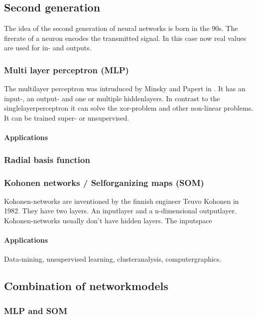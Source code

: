 \documentclass[10pt,a4paper,DIV=11]{scrreprt}
\begin{document}
\subsection{Second generation}
The idea of the second generation of neural networks is born in the 90s. The firerate of a neuron encodes the transmitted signal. In this case now real values are used for in- and outputs.

\subsubsection{Multi layer perceptron (MLP)} \label{sec:mlp}
The multilayer perceptron was intruduced by Minsky and Papert in . It has an input-, an output- and
one or multiple hiddenlayers. In contrast to the singlelayerperceptron it can solve the xor-problem and other non-linear problems. It can be trained super- or unsupervised.

\paragraph{Applications}

\subsubsection{Radial basis function} %


\subsubsection{Kohonen networks / Selforganizing maps (SOM)}
Kohonen-networks are inventioned by the finnish engineer Teuvo Kohonen in 1982. They have two layers. An inputlayer and a n-dimensional outputlayer.
Kohonen-networks usually don't have hidden layers.
The inputspace 

\paragraph{Applications}
Data-mining, unsupervised learning, clusteranalysis, computergraphics. 

\subsection{Combination of networkmodels}

\subsubsection{MLP and SOM} %
\end{document}
